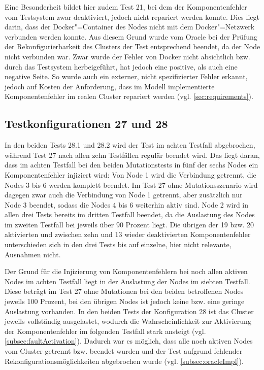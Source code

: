 Eine Besonderheit bildet hier zudem Test 21, bei dem der Komponentenfehler vom Testsystem zwar deaktiviert, jedoch nicht repariert werden konnte.
Dies liegt darin, dass der Docker"=Container des Nodes nicht mit dem Docker"=Netzwerk verbunden werden konnte.
Aus diesem Grund wurde vom Oracle bei der Prüfung der Rekonfigurierbarkeit des Clusters der Test entsprechend beendet, da der Node nicht verbunden war.
Zwar wurde der Fehler von Docker nicht absichtlich bzw. durch das Testsystem herbeigeführt, hat jedoch eine positive, als auch eine negative Seite.
So wurde auch ein externer, nicht spezifizierter Fehler erkannt, jedoch auf Kosten der Anforderung, dass im Modell implementierte Komponentenfehler im realen Cluster repariert werden (vgl. \cref{sec:requirements}).

\subsection{Testkonfigurationen 27 und 28}
\label{subsec:noReconf2728}

In den beiden Tests 28.1 und 28.2 wird der Test im achten Testfall abgebrochen, während Test 27 nach allen zehn Testfällen regulär beendet wird.
Das liegt daran, dass im achten Testfall bei den beiden Mutationstests in fünf der sechs Nodes ein Komponentenfehler injiziert wird: Von Node 1 wird die Verbindung getrennt, die Nodes 3 bis 6 werden komplett beendet.
Im Test 27 ohne Mutationsszenario wird dagegen zwar auch die Verbindung von Node 1 getrennt, aber zusätzlich nur Node 3 beendet, sodass die Nodes 4 bis 6 weiterhin aktiv sind.
Node 2 wird in allen drei Tests bereits im dritten Testfall beendet, da die Auslastung des Nodes im zweiten Testfall bei jeweils über 90 Prozent liegt.
Die übrigen der 19 bzw. 20 aktivierten und zwischen zehn und 13 wieder deaktivierten Komponentenfehler unterschieden sich in den drei Tests bis auf einzelne, hier nicht relevante, Ausnahmen nicht.

Der Grund für die Injizierung von Komponentenfehlern bei noch allen aktiven Nodes im achten Testfall liegt in der Auslastung der Nodes im siebten Testfall.
Diese beträgt im Test 27 ohne Mutationen bei den beiden betroffenen Nodes jeweils 100 Prozent, bei den übrigen Nodes ist jedoch keine bzw. eine geringe Auslastung vorhanden.
In den beiden Tests der Konfiguration 28 ist das Cluster jeweils vollständig ausgelastet, wodurch die Wahrscheinlichkeit zur Aktivierung der Komponentenfehler im folgenden Testfall stark ansteigt (vgl. \cref{subsec:faultActivation}).
Dadurch war es möglich, dass alle noch aktiven Nodes vom Cluster getrennt bzw. beendet wurden und der Test aufgrund fehlender Rekonfigurationsmöglichkeiten abgebrochen wurde (vgl. \cref{subsec:oracleImpl}).


